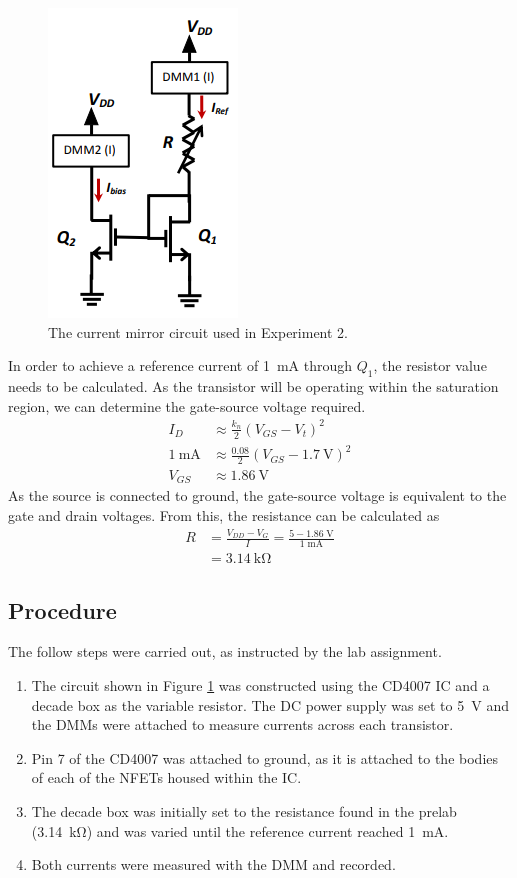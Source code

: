 \documentclass{report}
\begin{document}
\begin{figure}[H]
	\centering
	\includegraphics[width=0.2\linewidth]{exp2ckt}
	\caption{The current mirror circuit used in Experiment 2.}
	\label{fig:exp2ckt}
\end{figure}
In order to achieve a reference current of \SI{1}{\mA} through $Q_1$, the resistor value needs to be calculated. As the transistor will be operating within the saturation region, we can determine the gate-source voltage required.
\begin{align*}
	I_D & \approx \frac{k_n}{2} \left(V_{GS} - V_t\right)^2  \\
	\SI{1}{\mA} & \approx \frac{0.08}{2} \left( V_{GS} - \SI{1.7}{\V}\right)^2 \\
	V_{GS} & \approx \SI{1.86}{\V}
\end{align*}
As the source is connected to ground, the gate-source voltage is equivalent to the gate and drain voltages. From this, the resistance can be calculated as \begin{align*}
	R & = \frac{V_{DD} - V_G}{I} = \frac{5 - 1.86 \; \si{\V}}{1 \; \si{\mA}} \\
		& = \SI{3.14}{\kohm}
\end{align*}

\pagebreak
\subsection{Procedure}
The follow steps were carried out, as instructed by the lab assignment.
\begin{enumerate}
	\item The circuit shown in Figure \ref{fig:exp2ckt} was constructed using the CD4007 IC and a decade box as the variable resistor. The DC power supply was set to \SI{5}{\V} and the DMMs were attached to measure currents across each transistor.
	\item Pin 7 of the CD4007 was attached to ground, as it is attached to the bodies of each of the NFETs housed within the IC.
	\item The decade box was initially set to the resistance found in the prelab (\SI{3.14}{\kohm}) and was varied until the reference current reached \SI{1}{\mA}.
	\item Both currents were measured with the DMM and recorded.
\end{enumerate}
\end{document}
